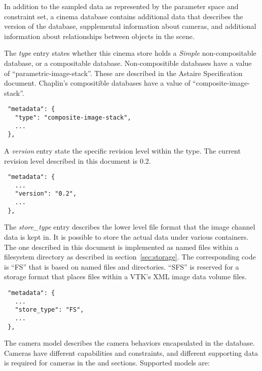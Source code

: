 \label{sec:metadata}

In addition to the sampled data as represented by the parameter space and constraint set, a cinema database contains additional data that describes the version of the database, supplemental information about cameras, and additional information about relationships between objects in the scene.


The \textit{type} entry states whether this cinema store holds a \textit{Simple} non-compositable database, or a compositable database. Non-compositible databases have a value of ``parametric-image-stack''. These are described in the Astaire Specification document. Chaplin's compositible databases have a value of ``composite-image-stack''.

\begin{verbatim}
 "metadata": {
   "type": "composite-image-stack",
   ...
 },
\end{verbatim}


A \textit{version} entry state the specific revision level within the type. The current revision level described in this document is 0.2.

\begin{verbatim}
 "metadata": {
   ...
   "version": "0.2",
   ...
 },
\end{verbatim}


The \textit{store\_type} entry describes the lower level file format that the image channel data is kept in. It is possible to store the actual data under various containers. The one described in this document is implemented as named files within a filesystem directory as described in section~\ref{sec:storage}. The corresponding code is ``FS''  that is based on named files and directories. ``SFS'' is reserved for a storage format that places files within a VTK's XML image data volume files.

\begin{verbatim}
 "metadata": {
   ...
   "store_type": "FS",
   ...
 },
\end{verbatim}

\label{sec:cameramodel}

The camera model describes the camera behaviors encapsulated in the database. 
Cameras have different capabilities and constraints, and different supporting data is required for cameras in the \metadata and \parameter sections.  Supported models are:

